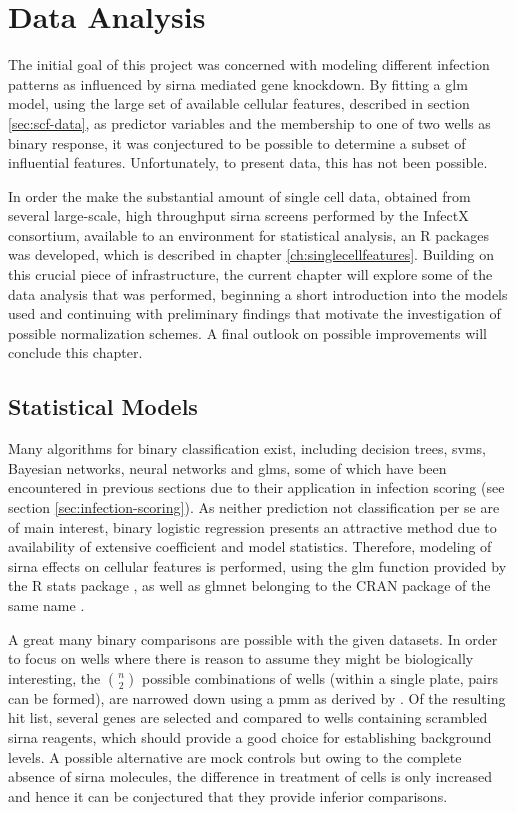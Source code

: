 \chapter{Data Analysis}
\label{ch:data-analysis}

The initial goal of this project was concerned with modeling different infection patterns as influenced by \gls{sirna} mediated gene knockdown. By fitting a \gls{glm} model, using the large set of available cellular features, described in section \ref{sec:scf-data}, as predictor variables and the membership to one of two wells as binary response, it was conjectured to be possible to determine a subset of influential features. Unfortunately, to present data, this has not been possible.

In order the make the substantial amount of single cell data, obtained from several large-scale, high throughput \gls{sirna} screens performed by the InfectX consortium, available to an environment for statistical analysis, an R packages was developed, which is described in chapter \ref{ch:singlecellfeatures}. Building on this crucial piece of infrastructure, the current chapter will explore some of the data analysis that was performed, beginning a short introduction into the models used and continuing with preliminary findings that motivate the investigation of possible normalization schemes. A final outlook on possible improvements will conclude this chapter.

\section{Statistical Models}
Many algorithms for binary classification exist, including decision trees, \glspl{svm}, Bayesian networks, neural networks and \glspl{glm}, some of which have been encountered in previous sections due to their application in infection scoring (see section \ref{sec:infection-scoring}). As neither prediction not classification per se are of main interest, binary logistic regression presents an attractive method due to availability of extensive coefficient and model statistics. Therefore, modeling of \gls{sirna} effects on cellular features is performed, using the glm function provided by the R stats package \citep{RCoreTeam2015}, as well as glmnet belonging to the CRAN package of the same name \citep{Friedman2010a}.

A great many binary comparisons are possible with the given datasets. In order to focus on wells where there is reason to assume they might be biologically interesting, the $n \choose 2$ possible combinations of wells (within a single plate,  pairs can be formed), are narrowed down using a \gls{pmm} as derived by \cite{Ramo2014}. Of the resulting hit list, several genes are selected and compared to wells containing scrambled \gls{sirna} reagents, which should provide a good choice for establishing background levels. A possible alternative are mock controls but owing to the complete absence of \gls{sirna} molecules, the difference in treatment of cells is only increased and hence it can be conjectured that they provide inferior comparisons.

